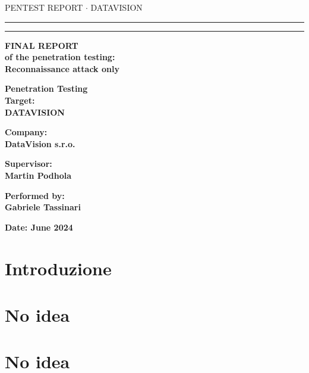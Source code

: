 \documentclass[a4paper]{article}
\numberwithin{equation}{section}
\begin{document}
\begin{titlepage}
\begin{center}
{{\Large{\textsc{PENTEST REPORT $\cdot$ DATAVISION}}}} \rule[0.1cm]{15.8cm}{0.1mm}
\rule[0.5cm]{15.8cm}{0.6mm}
{\small{\bf FINAL REPORT\\
of the penetration testing: \\
Reconnaissance attack only}}
\end{center}
\vspace{15mm}
\begin{center}
{\LARGE{\bf Penetration Testing}}\\
\vspace{3mm}
{\LARGE{\bf Target:}}\\
\vspace{3mm}
{\LARGE{\bf DATAVISION}}\\
\vspace{3mm}
\end{center}
\vspace{40mm}
\par
\noindent
\begin{minipage}[t]{0.47\textwidth}
{\large{\bf Company:\\
DataVision s.r.o.}}
\end{minipage}
\hfill
\begin{minipage}[t]{0.47\textwidth}\raggedleft
{\large{\bf Supervisor:\\
Martin Podhola}}
\end{minipage}
\vspace{20mm}
\begin{center}
    {\large{\bf Performed by:\\
    Gabriele Tassinari }}
\end{center}
\vspace{30mm}
\begin{center}
{\large{\bf 
Date: June 2024 }}
\end{center}
\end{titlepage}
\newpage
\newpage
\tableofcontents 
\newpage
    
\section{Introduzione}


\section{No idea}

\section{No idea}
\newpage
\end{document}
